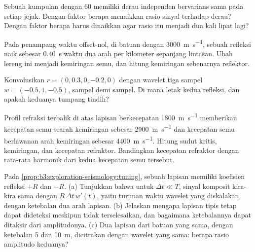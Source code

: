 \begin{exercise}[$\star\star$]\label{exo:b3:exploration-seismology:7}
Sebuah kumpulan dengan  60 memiliki derau independen bervarians sama pada setiap jejak. Dengan
faktor berapa  menaikkan rasio sinyal terhadap derau? Dengan faktor berapa
 harus dinaikkan agar rasio itu menjadi dua kali lipat lagi?
\end{exercise}

\begin{exercise}[$\star\star$]\label{exo:b3:exploration-seismology:8}
Pada penampang waktu offset-nol, di batuan dengan \qty{3000}{m.s^{-1}}, sebuah refleksi
naik sebesar \qty{0.40}{s} waktu dua arah per kilometer sepanjang lintasan. Ubah
lereng ini menjadi kemiringan semu, dan hitung kemiringan sebenarnya reflektor.
\end{exercise}

\begin{exercise}[$\star\star$]\label{exo:b3:exploration-seismology:9}
Konvolusikan  $r = (0, 0.3, 0, -0.2, 0)$ dengan
wavelet tiga sampel $w = (-0.5, 1, -0.5)$, sampel demi sampel. Di mana letak
kedua refleksi, dan apakah keduanya tumpang tindih?
\end{exercise}

\begin{exercise}[$\star\star\star$]\label{exo:b3:exploration-seismology:10}
Profil refraksi terbalik di atas lapisan berkecepatan \qty{1800}{m.s^{-1}} memberikan
kecepatan semu searah kemiringan sebesar \qty{2900}{m.s^{-1}} dan kecepatan semu
berlawanan arah kemiringan sebesar \qty{4400}{m.s^{-1}}. Hitung sudut kritis, kemiringan, dan
kecepatan refraktor. Bandingkan kecepatan refraktor dengan rata-rata harmonik dari kedua
kecepatan semu tersebut.
\end{exercise}

\begin{exercise}[$\star\star\star$]\label{exo:b3:exploration-seismology:11}
Pada \cref{prop:b3:exploration-seismology:tuning}, sebuah lapisan memiliki koefisien refleksi
$+R$ dan $-R$. (a) Tunjukkan bahwa untuk $\Delta t \ll T$, sinyal komposit
kira-kira sama dengan $R\,\Delta t\,w'(t)$, yaitu turunan waktu wavelet
yang diskalakan dengan ketebalan dua arah lapisan. (b) Jelaskan mengapa lapisan tipis tetap dapat
dideteksi meskipun tidak terselesaikan, dan bagaimana ketebalannya dapat ditaksir dari
amplitudonya. (c) Dua lapisan dari batuan yang sama, dengan ketebalan 5 dan \qty{10}{m}, dicitrakan
dengan wavelet yang sama: berapa rasio amplitudo keduanya?
\end{exercise}

